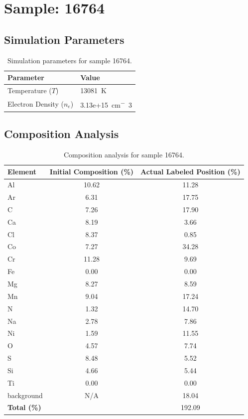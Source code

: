 \documentclass[a4paper,11pt]{article}
\begin{document}
\clearpage

\section{Sample: 16764}
\subsection{Simulation Parameters}
\begin{table}[h!]
    \centering
    \begin{tabular}{ll}
        \toprule
        \textbf{Parameter} & \textbf{Value} \\
        \midrule
        Temperature ($T$) & 13081 \,\si{K} \\
        Electron Density ($n_e$) & 3.13e+15 \,\si{cm^-3} \\
        \bottomrule
    \end{tabular}
    \caption{Simulation parameters for sample 16764.}
    \label{tab:params_16764}
\end{table}

\subsection{Composition Analysis}
\begin{table}[h!]
    \centering
    \begin{tabular}{lcc}
        \toprule
        \textbf{Element} & \textbf{Initial Composition (\%)} & \textbf{Actual Labeled Position (\%)} \\
        \midrule
        Al & 10.62 & 11.28 \\
        Ar & 6.31 & 17.75 \\
        C & 7.26 & 17.90 \\
        Ca & 8.19 & 3.66 \\
        Cl & 8.37 & 0.85 \\
        Co & 7.27 & 34.28 \\
        Cr & 11.28 & 9.69 \\
        Fe & 0.00 & 0.00 \\
        Mg & 8.27 & 8.59 \\
        Mn & 9.04 & 17.24 \\
        N & 1.32 & 14.70 \\
        Na & 2.78 & 7.86 \\
        Ni & 1.59 & 11.55 \\
        O & 4.57 & 7.74 \\
        S & 8.48 & 5.52 \\
        Si & 4.66 & 5.44 \\
        Ti & 0.00 & 0.00 \\
        background & N/A & 18.04 \\

        \midrule
        \textbf{Total (\%)} & & 192.09 \\
        \bottomrule
    \end{tabular}
    \caption{Composition analysis for sample 16764.}
    \label{tab:comp_16764}
\end{table}
\end{document}
